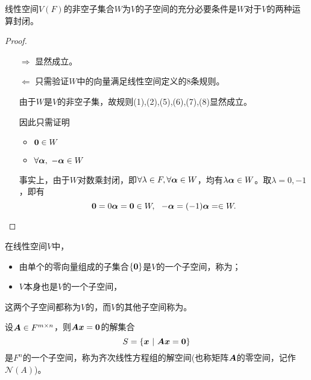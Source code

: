 \begin{frame}
\begin{dingli}
  线性空间$V(F)$的非空子集合$W$为$V$的子空间的充分必要条件是$W$对于$V$的两种运算封闭。
\end{dingli}\pause

\begin{proof}
\begin{itemize}
\item[$\Rightarrow$]显然成立。\\

\item[$\Leftarrow$] 只需验证$W$中的向量满足线性空间定义的$8$条规则。\pause 
  \vspace{.1in} 

  由于$W$是$V$的非空子集，故规则(1),(2),(5),(6),(7),(8)显然成立。\pause 
  \vspace{.1in} 
  
  因此只需证明
  \begin{itemize}
    \item $\M0 \in W$
    \item $\forall \boldsymbol{\alpha}, ~ -\boldsymbol{\alpha} \in W$
  \end{itemize} \vspace{.1in} \pause 

  事实上，由于$W$对数乘封闭，即$\forall \lambda \in F, \forall \boldsymbol{\alpha} \in W$，均有$\lambda\boldsymbol{\alpha} \in W$。取$\lambda=0, -1$，即有
  $$
  \M0 = 0\alphabd = \M0 \in W, ~~
  -\alphabd = (-1)\alphabd = \in W. 
  $$

\end{itemize}
\end{proof}
\end{frame}

\begin{frame}
  \begin{li}
    在线性空间$V$中，
    \begin{itemize}
    \item 由单个的零向量组成的子集合$\{\M0\}$是$V$的一个子空间，称为；
    \item $V$本身也是$V$的一个子空间，
    \end{itemize}
    这两个子空间都称为$V$的，而$V$的其他子空间称为。
  \end{li}
\end{frame}

\begin{frame}
\begin{li}
  设$\boldsymbol{A}\in F^{m\times n}$，则$\MA\vx=\M0$的解集合
  $$
  S = \{\vx ~|~ \MA \vx = \M0\}
  $$
  是$F^n$的一个子空间，称为齐次线性方程组的解空间(也称矩阵$\boldsymbol{A}$的零空间，记作$\mathcal N(A)$)。 \vspace{.1in} \pause 


\end{li}
\end{frame}

